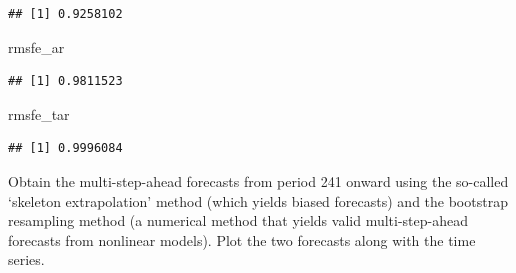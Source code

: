 \documentclass[
  12pt,
  oneside]{book}
\newenvironment{Shaded}{\begin{snugshade}}{\end{snugshade}}
\newcommand{\NormalTok}[1]{#1}
\begin{document}
\begin{verbatim}
## [1] 0.9258102
\end{verbatim}

\begin{Shaded}
\begin{Highlighting}[]
\NormalTok{rmsfe\_ar}
\end{Highlighting}
\end{Shaded}

\begin{verbatim}
## [1] 0.9811523
\end{verbatim}

\begin{Shaded}
\begin{Highlighting}[]
\NormalTok{rmsfe\_tar}
\end{Highlighting}
\end{Shaded}

\begin{verbatim}
## [1] 0.9996084
\end{verbatim}

Obtain the multi-step-ahead forecasts from period 241 onward using the so-called `skeleton extrapolation' method (which yields biased forecasts) and the bootstrap resampling method (a numerical method that yields valid multi-step-ahead forecasts from nonlinear models). Plot the two forecasts along with the time series.
\end{document}
